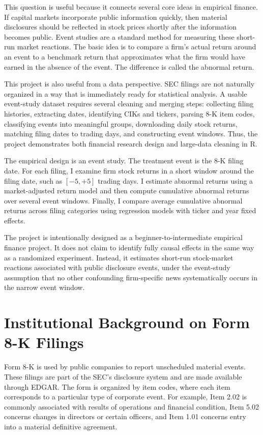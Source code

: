 \documentclass[12pt]{article}
\begin{document}
	This question is useful because it connects several core ideas in empirical finance. If capital markets incorporate public information quickly, then material disclosures should be reflected in stock prices shortly after the information becomes public. Event studies are a standard method for measuring these short-run market reactions. The basic idea is to compare a firm's actual return around an event to a benchmark return that approximates what the firm would have earned in the absence of the event. The difference is called the abnormal return.
	
	This project is also useful from a data perspective. SEC filings are not naturally organized in a way that is immediately ready for statistical analysis. A usable event-study dataset requires several cleaning and merging steps: collecting filing histories, extracting dates, identifying CIKs and tickers, parsing 8-K item codes, classifying events into meaningful groups, downloading daily stock returns, matching filing dates to trading days, and constructing event windows. Thus, the project demonstrates both financial research design and large-data cleaning in R.
	
	The empirical design is an event study. The treatment event is the 8-K filing date. For each filing, I examine firm stock returns in a short window around the filing date, such as $[-5,+5]$ trading days. I estimate abnormal returns using a market-adjusted return model and then compute cumulative abnormal returns over several event windows. Finally, I compare average cumulative abnormal returns across filing categories using regression models with ticker and year fixed effects.
	
	The project is intentionally designed as a beginner-to-intermediate empirical finance project. It does not claim to identify fully causal effects in the same way as a randomized experiment. Instead, it estimates short-run stock-market reactions associated with public disclosure events, under the event-study assumption that no other confounding firm-specific news systematically occurs in the narrow event window.
	
	\section{Institutional Background on Form 8-K Filings}
	
	Form 8-K is used by public companies to report unscheduled material events. These filings are part of the SEC's disclosure system and are made available through EDGAR. The form is organized by item codes, where each item corresponds to a particular type of corporate event. For example, Item 2.02 is commonly associated with results of operations and financial condition, Item 5.02 concerns changes in directors or certain officers, and Item 1.01 concerns entry into a material definitive agreement.
	
\end{document}
